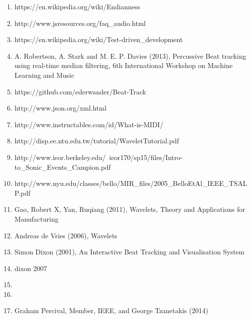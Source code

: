 \documentclass[a4paper, 11pt]{article}
\begin{document}
\begin{enumerate}
\item https://en.wikipedia.org/wiki/Endianness %
\item http://www.jsresources.org/faq\_audio.html %
\item https://en.wikipedia.org/wiki/Test-driven\_development %
\item A. Robertson, A. Stark and M. E. P. Davies (2013), Percussive Beat tracking using real-time median filtering, 6th International Workshop on Machine Learning and Music %
\item https://github.com/ederwander/Beat-Track %
\item http://www.json.org/xml.html %
\item http://www.instructables.com/id/What-is-MIDI/ %
\item http://disp.ee.ntu.edu.tw/tutorial/WaveletTutorial.pdf %
\item http://www.ieor.berkeley.edu/~ieor170/sp15/files/Intro-to\_Sonic\_Events\_Campion.pdf %
\item http://www.nyu.edu/classes/bello/MIR\_files/2005\_BelloEtAl\_IEEE\_TSALP.pdf %
\item Gao, Robert X, Yan, Ruqiang (2011), Wavelets, Theory and Applications for Manufacturing %
\item Andreas de Vries (2006), Wavelets %
\item Simon Dixon (2001), An Interactive Beat Tracking and Visualisation System %
\item dixon 2007 %
\item %
\item %
\item Graham Percival, Member, IEEE, and George Tzanetakis (2014) %
\end{enumerate}
\end{document}
